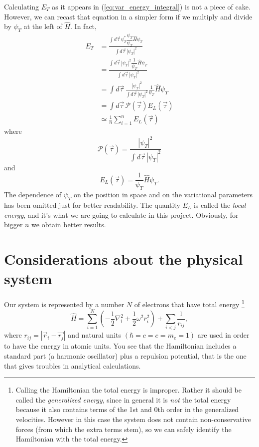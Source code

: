 \documentclass[a4paper,twoside,11pt]{book}
\begin{document}
Calculating $E_T$ as it appears in (\ref{eq:var_energy_integral}) is not a piece of cake. However, we can recast that equation in a simpler form if we multiply and divide by $\psi_T$ at the left of $\hat{H}$. In fact,
\begin{align}
	E_T 
	&= \frac{\int d\vec{\tau} \, \psi_T^* \dfrac{\psi_T}{\psi_T} \hat{H} \psi_T}{\int d\vec{\tau} \, |\psi_T|^2} \\
	&= \frac{\int d\vec{\tau} \, |\psi_T|^2 \dfrac{1}{\psi_T} \hat{H} \psi_T}{\int d\vec{\tau} \, |\psi_T|^2} \\
	&= \int d\vec{\tau} \, \frac{|\psi_T|^2}{\int d\vec{\tau} \, |\psi_T|^2} \frac{1}{\psi_T} \hat{H} \psi_T \\
	&= \int d\vec{\tau} \, \mathcal{P}(\vec{\tau}) E_L(\vec{\tau}) \\
	&\simeq \frac{1}{n} \sum_{i = 1}^{n} E_L(\vec{\tau})
\end{align}
where
\begin{equation}
	\mathcal{P}(\vec{\tau}) = \frac{|\psi_T|^2}{\int d\vec{\tau} \, |\psi_T|^2}
\end{equation}
and
\begin{equation}
	E_L(\vec{\tau}) = \frac{1}{\psi_T} \hat{H} \psi_T.
\end{equation}
The dependence of $\psi_T$ on the position in space and on the variational parameters has been omitted just for better readability. The quantity $E_L$ is called the \emph{local energy}, and it's what we are going to calculate in this project. Obviously, for bigger $n$ we obtain better results.

\section{Considerations about the physical system}
\label{sec:considerations}
Our system is represented by a number $N$ of electrons that have total energy
\footnote{
Calling the Hamiltonian the total energy is improper. Rather it should be called the \emph{generalized energy}, since in general it is \emph{not} the total energy because it also contains terms of the 1st and 0th order in the generalized velocities. However in this case the system does not contain non-conservative forces (from which the extra terms stem), so we can safely identify the Hamiltonian with the total energy.
}
\begin{equation}
	\hat{H} = 
	\sum_{i=1}^{N} \left( -\frac{1}{2}\nabla_i^2 + \frac{1}{2}\omega^2r_i^2 \right)
	+ \sum_{i<j}\frac{1}{r_{ij}},
	\label{eq:full_hamiltonian}
\end{equation}
where $r_{ij} = |\vec{r}_i - \vec{r_j}|$ and natural units $( \hbar = c = e = m_e = 1)$ are used in order to have the energy in atomic units. You see that the Hamiltonian includes a standard part (a harmonic oscillator) plus a repulsion potential, that is the one that gives troubles in analytical calculations.
\end{document}
